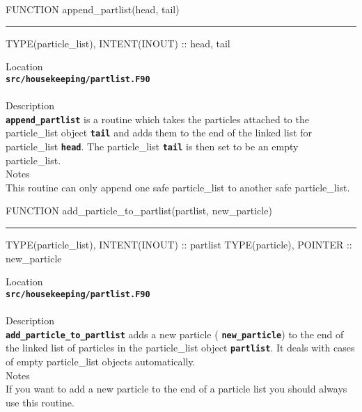 \documentclass[12pt,a4paper]{article}
\newcommand{\HRule}{\rule[0.3cm]{\linewidth}{0.5mm}}
\newcommand{\inlinecode}[1]{{\color{warwickred} \bf\texttt{#1}}}
\begin{document}
\pagebreak
\begin{codedef}
FUNCTION append_partlist(head, tail)
\HRule
TYPE(particle_list), INTENT(INOUT) :: head, tail
\end{codedef}
\vspace{1cm}
{\Large Location\\}
\inlinecode{src/housekeeping/partlist.F90}\\
\\[0.5cm]
{\Large Description\\}
\inlinecode{append\_partlist} is a routine which takes the particles
attached to the particle\_list object \inlinecode{tail} and adds them to the
end of the linked list for particle\_list \inlinecode{head}. The particle\_list
\inlinecode{tail} is then set to be an empty particle\_list.
\\[0.5cm]
{\Large Notes\\}
This routine can only append one safe particle\_list to another safe
particle\_list.

\pagebreak
\begin{codedef}
FUNCTION add_particle_to_partlist(partlist, new_particle)
\HRule
TYPE(particle_list), INTENT(INOUT) :: partlist
TYPE(particle), POINTER :: new_particle
\end{codedef}
\vspace{1cm}
{\Large Location\\}
\inlinecode{src/housekeeping/partlist.F90}\\
\\[0.5cm]
{\Large Description\\}
\inlinecode{add\_particle\_to\_partlist} adds a new
particle (\inlinecode{new\_particle}) to the end of the linked list of
particles in the particle\_list object \inlinecode{partlist}. It deals with
cases of empty particle\_list objects automatically.
\\[0.5cm]
{\Large Notes\\}
If you want to add a new particle to the end of a particle list you should
always use this routine.
\end{document}
